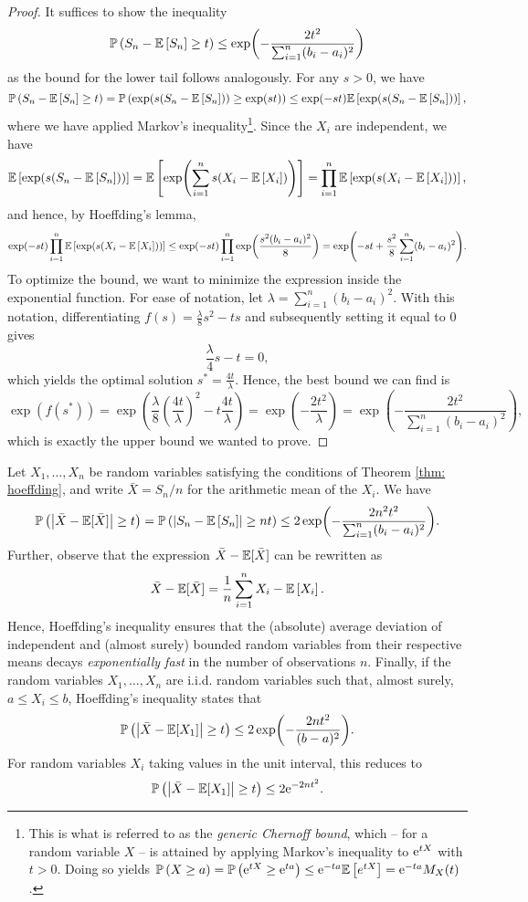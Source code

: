 \begin{proof}
It suffices to show the inequality
\[
    \mathbb{P}\left(S_n - \mathbb{E}\left[S_n\right] \geq t\right) \leq \exp(-\frac{2t^2}{\sum_{i=1}^n (b_i - a_i)^2})
\]
as the bound for the lower tail follows analogously. For any $s>0$, we have
\[
    \mathbb{P}\left(S_n - \mathbb{E}\left[S_n\right] \geq t\right) = \mathbb{P}\left(\exp(s(S_n - \mathbb{E}\left[S_n\right])) \geq \exp(st)\right) \leq \exp(-st) \mathbb{E}\left[\exp(s(S_n - \mathbb{E}\left[S_n\right]))\right],
\]
where we have applied Markov's inequality\footnote{This is what is referred to as the \emph{generic Chernoff bound}, which -- for a random variable $X$ -- is attained by applying Markov's inequality to $\mathrm{e}^{tX}$ with $t > 0$. Doing so yields $\mathbb{P}\left(X \geq a\right) = \mathbb{P}\left(\mathrm{e}^{tX} \geq \mathrm{e}^{ta}\right) \leq \mathrm{e}^{-ta} \mathbb{E}\left[e^{tX}\right] = \mathrm{e}^{-ta} M_X(t)$.}. Since the $X_i$ are independent, we have
\[
    \mathbb{E}\left[\exp(s(S_n - \mathbb{E}\left[S_n\right]))\right] = \mathbb{E}\left[\exp(\sum_{i=1}^n s(X_i - \mathbb{E}\left[X_i\right]))\right] = \prod_{i=1}^n \mathbb{E}\left[\exp(s(X_i - \mathbb{E}\left[X_i\right]))\right],
\]
and hence, by Hoeffding's lemma,
\[
    \exp(-st) \prod_{i=1}^n \mathbb{E}\left[\exp(s(X_i - \mathbb{E}\left[X_i\right]))\right] \leq \exp(-st) \prod_{i=1}^n \exp(\frac{s^2 (b_i-a_i)^2}{8}) = \exp(-st + \frac{s^2}{8} \sum_{i=1}^n (b_i-a_i)^2).
\]
To optimize the bound, we want to minimize the expression inside the exponential function. For ease of notation, let $\lambda = \sum_{i=1}^n (b_i-a_i)^2$. With this notation, differentiating $f(s) = \frac{\lambda}{8} s^2 -ts$ and subsequently setting it equal to $0$ gives
\[
    \frac{\lambda}{4} s - t = 0,
\]
which yields the optimal solution $s^* = \frac{4t}{\lambda}$. Hence, the best bound we can find is
\[
    \exp(f(s^*)) = \exp(\frac{\lambda}{8} \left(\frac{4t}{\lambda}\right)^2 - t \frac{4t}{\lambda}) = \exp(-\frac{2t^2}{\lambda}) = \exp(-\frac{2t^2}{\sum_{i=1}^n (b_i - a_i)^2}),
\]
which is exactly the upper bound we wanted to prove.
\end{proof}

\begin{remark}
Let $X_1, \dots, X_n$ be random variables satisfying the conditions of Theorem \ref{thm: hoeffding}, and write $\bar X = S_n/n$ for the arithmetic mean of the $X_i$. We have
\[
    \mathbb{P}\left(\abs{\bar X - \mathbb{E}[\bar X]} \geq t\right) = \mathbb{P}\left(\abs{S_n - \mathbb{E}\left[S_n\right]} \geq nt\right) \leq 2 \exp(-\frac{2n^2t^2}{\sum_{i=1}^n (b_i - a_i)^2}).
\]
Further, observe that the expression $\bar X - \mathbb{E}[\bar X]$ can be rewritten as
\[
    \bar X - \mathbb{E}[\bar X] = \frac{1}{n} \sum_{i=1}^n X_i - \mathbb{E}\left[X_i\right].
\]
Hence, Hoeffding's inequality ensures that the (absolute) average deviation of independent and (almost surely) bounded random variables from their respective means decays \emph{exponentially fast} in the number of observations $n$. Finally, if the random variables $X_1, \dots, X_n$ are i.i.d. random variables such that, almost surely, $a \leq X_i \leq b$, Hoeffding's inequality states that
\[
    \mathbb{P}\left(\abs{\bar X - \mathbb{E}[X_1]} \geq t\right) \leq 2 \exp(-\frac{2nt^2}{(b - a)^2}).
\]
For random variables $X_i$ taking values in the unit interval, this reduces to
\[
    \mathbb{P}\left(\abs{\bar X - \mathbb{E}[X_1]} \geq t\right) \leq 2 \mathrm{e}^{-2nt^2}.
\]
\end{remark}
